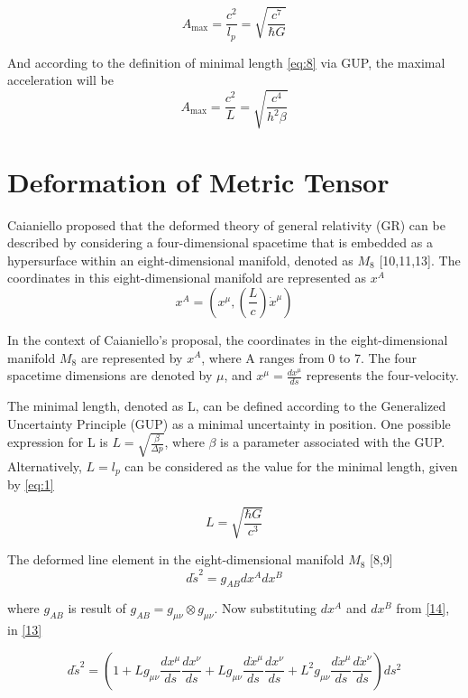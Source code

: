 \documentclass{article}
\begin{document}
\begin{equation}
A_{\text{max}} = \frac{c^2}{l_p} = \sqrt{\frac{c^7}{\hbar G}}
 \label{10}
\end{equation}

And according to the definition of minimal length \eqref{eq:8} via GUP, the maximal acceleration will be
\begin{equation}
A_{\text{max}} = \frac{c^2}{L} = \sqrt{\frac{c^4}{h^2 \beta}}
\label{11}
\end{equation}

\section{\Large Deformation of Metric Tensor}
Caianiello proposed that the deformed theory of general relativity (GR) can be described by considering a four-dimensional spacetime that is embedded as a hypersurface within an eight-dimensional manifold, denoted as $M_8$ [10,11,13]. The coordinates in this eight-dimensional manifold are represented as $x^A$
\begin{equation}
x^A = (x^\mu, \left(\frac{L}{c} \right)\dot{x}
^{\mu}) 
\label{14}
\end{equation}

In the context of Caianiello's proposal, the coordinates in the eight-dimensional manifold $M_8$ are represented by $x^A$, where A ranges from 0 to 7. The four spacetime dimensions are denoted by $\mu$, and $x^\mu = \frac{dx^\mu}{ds}$ represents the four-velocity.

The minimal length, denoted as L, can be defined according to the Generalized Uncertainty Principle (GUP) as a minimal uncertainty in position. One possible expression for L is $L = \sqrt{\frac{\beta}{\Delta p}}
$, where $\beta$ is a parameter associated with the GUP. Alternatively, $L=l_p$ can be considered as the value for the minimal length, given by \eqref{eq:1}

$$L = \sqrt{\frac{\hbar G}{c^3}}$$

The deformed line element in the eight-dimensional manifold $M_8$ [8,9]
\begin{equation}
    d\widetilde{s} ^2 = g_{AB} dx^A dx^B
    \label{13}
\end{equation}

where $g_{AB}$ is result of $g_{AB} = g_{\mu\nu} \otimes g_{\mu\nu}$. Now substituting $dx^A$ and $dx^B$ from \eqref{14}, in \eqref{13}

\begin{equation}
d\widetilde{s}^2= \left(1 + Lg_{\mu\nu}\frac{dx^{\mu}}{ds}\frac{dx^{\nu}}{ds} + Lg_{\mu\nu}\frac{d\dot x^{\mu}}{ds}\frac{dx^{\nu}}{ds} + L^2g_{\mu\nu}\frac{d\dot x^{\mu}}{ds}\frac{d\dot x^{\nu}}{ds}\right)ds^2
\label{22}
\end{equation}
\end{document}
